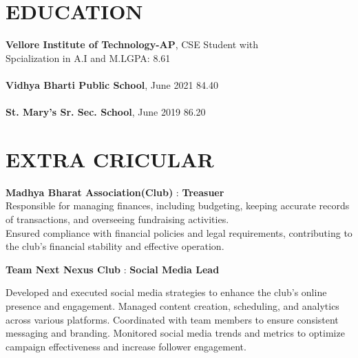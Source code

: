 \documentclass[margin]{res}
\begin{document}
\begin{resume}

\section{EDUCATION}
\textbf{Vellore Institute of Technology-AP}, CSE Student with\\ Spcialization in A.I and M.L\hfill GPA: 
8.61
\\
\\
\textbf{Vidhya Bharti Public School}, June 2021\hfill 
84.40
\\
\\
\textbf{St. Mary's Sr. Sec. School}, June 2019\hfill 
 86.20

\section{EXTRA CRICULAR}
\par
\textbf{Madhya Bharat Association(Club)} : \textbf{Treasuer}\\
 Responsible for managing finances, including budgeting, keeping accurate records of transactions, and overseeing fundraising activities.\\Ensured compliance with financial policies and legal requirements, contributing to the club’s financial stability and effective operation.

\par
\textbf{Team Next Nexus Club} : \textbf{Social Media Lead} 
\par
Developed and executed social media strategies to enhance the club’s online presence and engagement. Managed content creation, scheduling, and analytics across various platforms. Coordinated with team members to ensure consistent messaging and branding. Monitored social media trends and metrics to optimize campaign effectiveness and increase follower engagement.
 



\end{resume}
\end{document}
